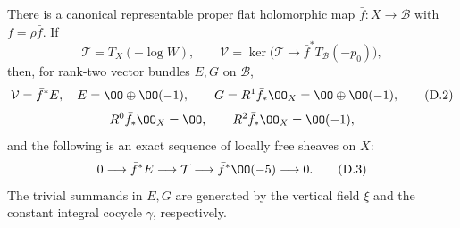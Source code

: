 \begin{proposition}\label{inv:D1.2}
There is a canonical representable proper flat holomorphic map
$\bar f:X\to\mathcal B$ with $f=\rho\bar f$. If
\[
 \mathcal T=T_X(-\log W),\qquad
 \mathcal V=\ker\bigl(\mathcal T\to
                   \bar f^*T_{\mathcal B}(-p_0)\bigr),
\]
then, for rank-two vector bundles $E,G$ on $\mathcal B$,
\[
 \mathcal V=\bar f^*E,\quad E=\OO\oplus\OO(-1),\qquad
 G=R^1\bar f_*\OO_X=\OO\oplus\OO(-1),                 \tag{D.2}
\]
\[
 R^0\bar f_*\OO_X=\OO,\qquad R^2\bar f_*\OO_X=\OO(-1),
\]
and the following is an exact sequence of locally free sheaves on $X$:
\[
 0\longrightarrow\bar f^*E\longrightarrow\mathcal T
 \longrightarrow\bar f^*\OO(-5)\longrightarrow0.       \tag{D.3}
\]
The trivial summands in $E,G$ are generated by the vertical field $\xi$
and the constant integral cocycle $\gamma$, respectively.
\end{proposition}

